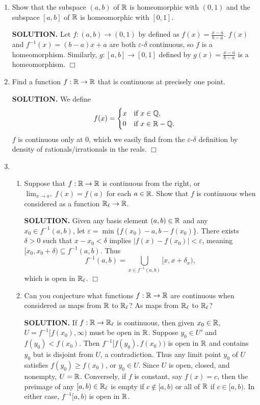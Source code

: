\documentclass{article}
\begin{document}
\begin{enumerate}
    \item Show that the subspace $(a, b)$ of $\mathbb{R}$ is homeomorphic with $(0, 1)$ and the subspace $[a, b]$ of $\mathbb{R}$ is homeomorphic with $[0, 1]$.

    {\bf SOLUTION.} Let $f: (a, b) \rightarrow (0, 1)$ by defined as $f(x) = \frac{x-a}{b-a}$. $f(x)$ and $f^{-1}(x) = (b-a)x+a$ are both $\varepsilon$-$\delta$ continuous, so $f$ is a homeomorphism. Similarly, $g: [a, b] \rightarrow [0, 1]$ defined by $g(x) = \frac{x-a}{b-a}$ is a homeomorphism. $\Box$

    \item Find a function $f: \mathbb{R} \rightarrow \mathbb{R}$ that is continuous at precisely one point.

    {\bf SOLUTION.} We define
    $$f(x) = \begin{cases}
        x &\text{if } x \in \mathbb{Q}, \\
        0 &\text{if } x \in \mathbb{R} - \mathbb{Q}.
    \end{cases}$$
    $f$ is continuous only at $0$, which we easily find from the $\varepsilon$-$\delta$ definition by density of rationals/irrationals in the reals. $\Box$

    \item 
    \begin{enumerate}
        \item Suppose that $f: \mathbb{R} \rightarrow \mathbb{R}$ is continuous from the right, or $\lim_{x \rightarrow a^+} f(x) = f(a)$ for each $a \in \mathbb{R}$. Show that $f$ is continuous when considered as a function $\mathbb{R}_\ell \rightarrow \mathbb{R}$.

        {\bf SOLUTION.} Given any basis element $(a, b) \in \mathbb{R}$ and any $x_0 \in f^{-1}(a, b)$, let $\varepsilon = \min \{f(x_0) - a, b - f(x_0)\}$. There exists $\delta > 0$ such that $x - x_0 < \delta$ implies $|f(x) - f(x_0)| < \varepsilon$, meaning $[x_0, x_0 + \delta) \subseteq f^{-1}(a, b)$. Thus
        $$f^{-1}(a, b) = \bigcup_{x \in f^{-1}(a, b)} [x, x+\delta_x),$$
        which is open in $\mathbb{R}_\ell$. $\Box$

        \item Can you conjecture what functions $f: \mathbb{R} \rightarrow \mathbb{R}$ are continuous when considered as maps from $\mathbb{R}$ to $\mathbb{R}_\ell$? As maps from $\mathbb{R}_\ell$ to $\mathbb{R}_\ell$?

        {\bf SOLUTION.} If $f: \mathbb{R} \rightarrow \mathbb{R}_\ell$ is continuous, then given $x_0 \in \mathbb{R}$, $U = f^{-1}[f(x_0), \infty)$ must be open in $\mathbb{R}$. Suppose $y_0 \in U'$ and $f(y_0) < f(x_0)$. Then $f^{-1}[f(y_0), f(x_0))$ is open in $\mathbb{R}$ and contains $y_0$ but is disjoint from $U$, a contradiction. Thus any limit point $y_0$ of $U$ satisfies $f(y_0) \geq f(x_0)$, or $y_0 \in U$. Since $U$ is open, closed, and nonempty, $U = \mathbb{R}$. Conversely, if $f$ is constant, say $f(x) = c$, then the preimage of any $[a, b) \in \mathbb{R}_\ell$ is empty if $c \notin [a, b)$ or all of $\mathbb{R}$ if $c \in [a, b)$. In either case, $f^{-1}[a, b)$ is open in $\mathbb{R}$.


\end{enumerate}
\end{enumerate}
\end{document}
